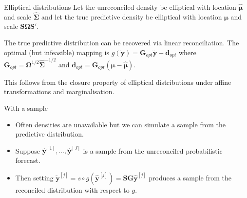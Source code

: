\documentclass{beamer}
\begin{document}
  \begin{frame}{Elliptical distributions}
  	Let the unreconciled density be elliptical with location  $\hat{\bm{\mu}}$ and scale $\hat{\bm{\Sigma}}$ and let the true predictive density be elliptical with location  ${\bm{\mu}}$ and scale ${\bm{S}}{\bm{\Omega}}{\bm{S}}'$.
  	\begin{theorem}
  		The true predictive distribution can be recovered via linear reconciliation.  The optimal (but infeasible) mapping is $g(\breve{\bm y})={\bm G}_{opt}\breve{\bm y}+{\bm d}_{opt}$ where $\bm{G}_{opt}={\bm\Omega}^{1/2}{\hat{\bm{\Sigma}}}^{-1/2}$ and ${\bm d}_{opt}={\bm G}_{opt}\left({\bm \mu}-\hat{\bm \mu}\right)$.
  	\end{theorem}
    This follows from the closure property of elliptical distributions under affine transformations and marginalisation.
  \end{frame}
  \begin{frame}{With a sample}
  	\begin{itemize}
  		\item Often densities are unavailable but we can simulate a sample from the predictive distribution.
  		\item Suppose $\bm{\hat{y}}^{[1]},\ldots,\bm{\hat{y}}^{[J]}$ is a sample from the unreconciled probabilistic forecast.
  		\item Then setting $\tilde{\bm y}^{[j]}=s\circ g(\hat{\bm y}^{[j]})=\bm{S}\bm{G}\hat{\bm y}^{[j]}$ produces a sample from the reconciled distribution with respect to $g$.
  	\end{itemize}
  \end{frame}
\end{document}
